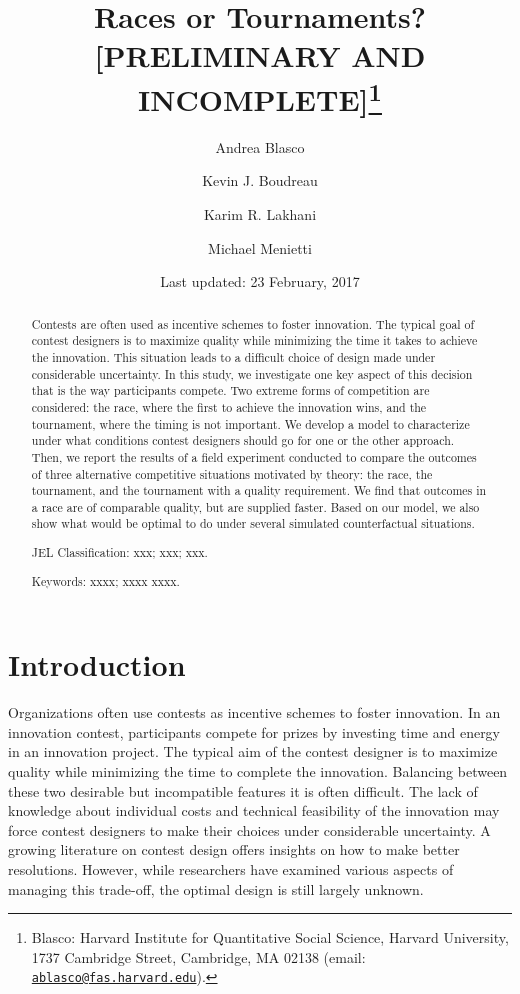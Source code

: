\documentclass[12pt,]{article}
\title{Races or Tournaments? {[}PRELIMINARY AND INCOMPLETE{]}\thanks{Blasco: Harvard Institute for Quantitative Social Science, Harvard
University, 1737 Cambridge Street, Cambridge, MA 02138 (email:
\href{mailto:ablasco@fas.harvard.edu}{\nolinkurl{ablasco@fas.harvard.edu}}).}}
\author{Andrea Blasco \and Kevin J. Boudreau \and Karim R. Lakhani \and Michael Menietti}
\date{Last updated: 23 February, 2017}
\theoremstyle{plain} %
\begin{document}
\maketitle
\begin{abstract}
Contests are often used as incentive schemes to foster innovation. The
typical goal of contest designers is to maximize quality while
minimizing the time it takes to achieve the innovation. This situation
leads to a difficult choice of design made under considerable
uncertainty. In this study, we investigate one key aspect of this
decision that is the way participants compete. Two extreme forms of
competition are considered: the race, where the first to achieve the
innovation wins, and the tournament, where the timing is not important.
We develop a model to characterize under what conditions contest
designers should go for one or the other approach. Then, we report the
results of a field experiment conducted to compare the outcomes of three
alternative competitive situations motivated by theory: the race, the
tournament, and the tournament with a quality requirement. We find that
outcomes in a race are of comparable quality, but are supplied faster.
Based on our model, we also show what would be optimal to do under
several simulated counterfactual situations.

\smallskip\noindent 
JEL Classification: xxx; xxx; xxx.

\smallskip\noindent 
Keywords: xxxx; xxxx xxxx.
\end{abstract}


\clearpage
\tableofcontents
\setcounter{tocdepth}{2}
\clearpage

\section{Introduction}\label{introduction}

Organizations often use contests as incentive schemes to foster
innovation. In an innovation contest, participants compete for prizes by
investing time and energy in an innovation project. The typical aim of
the contest designer is to maximize quality while minimizing the time to
complete the innovation. Balancing between these two desirable but
incompatible features it is often difficult. The lack of knowledge about
individual costs and technical feasibility of the innovation may force
contest designers to make their choices under considerable uncertainty.
A growing literature on contest design offers insights on how to make
better resolutions. However, while researchers have examined various
aspects of managing this trade-off, the optimal design is still largely
unknown.
\end{document}
